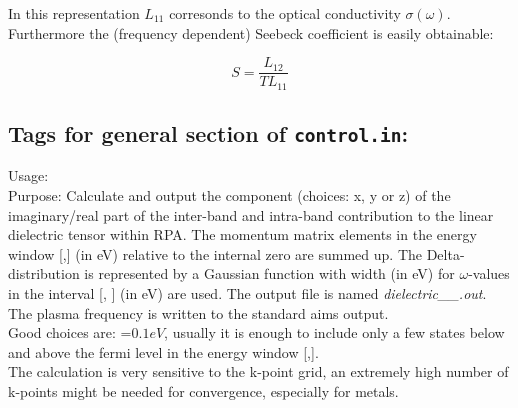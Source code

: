 In this representation $L_{11}$ corresonds to the optical conductivity $\sigma(\omega)$. Furthermore the (frequency dependent) Seebeck coefficient is easily obtainable: 

\begin{equation}
S = \frac{L_{12}}{TL_{11}}
\end{equation}
\newpage


\subsection*{Tags for general section of \texttt{control.in}:}
{
  \noindent
  Usage:         \\[1.0ex]
  Purpose: Calculate and output the   component (choices: x, y or z) of the imaginary/real part of the inter-band and intra-band contribution to the linear dielectric tensor within RPA. 
  The momentum matrix elements in the energy window [,] (in eV) relative to the internal zero are summed up. The Delta-distribution is 
  represented by a Gaussian function with width  (in eV) for  $\omega$-values 
  in the interval [, ] (in eV) are used. The output file is named \textit{dielectric\_}\textit{\_}\textit{.out}. 
  The plasma frequency is written to the standard aims output.\\
  Good choices are: =$0.1eV$, usually it is enough to include only a few states below and above the fermi level in the 
  energy window [,].\\
  The calculation is very sensitive to the k-point grid, an extremely high number of k-points might be needed for convergence, especially for metals.\\[1.0ex]
}
